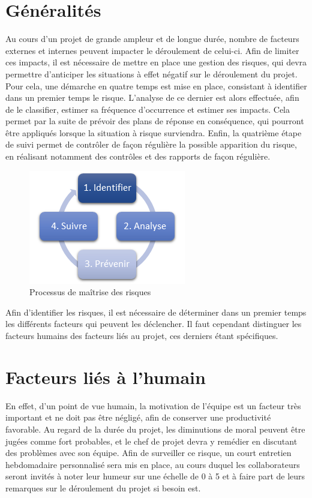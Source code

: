 \setcounter{section}{0}
\section{Généralités}

Au cours d’un projet de grande ampleur et de longue durée, nombre de facteurs externes et internes peuvent impacter le déroulement de celui-ci. Afin de limiter ces impacts, il est nécessaire de mettre en place une gestion des risques, qui devra permettre d’anticiper les situations à effet négatif sur le déroulement du projet. Pour cela, une démarche en quatre temps est mise en place, consistant à identifier dans un premier temps le risque. L’analyse de ce dernier est alors effectuée, afin de le classifier, estimer sa fréquence d’occurrence et estimer ses impacts. Cela permet par la suite de prévoir des plans de réponse en conséquence, qui pourront être appliqués lorsque la situation à risque surviendra. Enfin, la quatrième étape de suivi permet de contrôler de façon régulière la possible apparition du risque, en réalisant notamment des contrôles et des rapports de façon régulière. \\

\begin{figure}[H]
    \centering
    \label{fig-risque}
    \includegraphics[scale=0.6]{figures/processus_risques.png}
    \caption{Processus de maîtrise des risques}
\end{figure}

Afin d’identifier les risques, il est nécessaire de déterminer dans un premier temps les différents facteurs qui peuvent les déclencher. Il faut cependant distinguer les facteurs humains des facteurs liés au projet, ces derniers étant spécifiques. \\

\section{Facteurs liés à l'humain}

En effet, d’un point de vue humain, la motivation de l’équipe est un facteur très important et ne doit pas être négligé, afin de conserver une productivité favorable. Au regard de la durée du projet, les diminutions de moral peuvent être jugées comme fort probables, et le chef de projet devra y remédier en discutant des problèmes avec son équipe. Afin de surveiller ce risque, un court entretien hebdomadaire personnalisé sera mis en place, au cours duquel les collaborateurs seront invités à noter leur humeur sur une échelle de 0 à 5 et à faire part de leurs remarques sur le déroulement du projet si besoin est. \\
 
